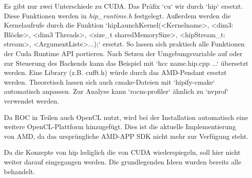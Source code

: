	Es gibt nur zwei Unterschiede zu CUDA. Das Präfix \li`cu` wir durch \li`hip` ersetzt. Diese Funktionen werden in \textit{hip{\_}runtime.h} festgelegt. Außerdem werden die \Gls{Kernel}aufrufe durch die Funktion \li`hipLaunchKernel(<Kernelname>, <dim3: Blöcke>, <dim3 Threads>, <size_t sharedMemorySize>, <hipStream_t: stream>, <ArgumentListe>...);` ersetzt. So lassen sich praktisch alle Funktionen der Cuda Runtime \Gls{API} portieren. Nach Setzen der Umgebungsvariable auf oder zur Steuerung des Backends kann das Beispiel mit \li`hcc name.hip.cpp ...` übersetzt werden. Eine Library (z.B. cufft.h) würde durch das AMD-Pendant ersetzt werden. Theoretisch lassen sich auch cmake-Dateien mit \li`hipify-cmake` automatisch anpassen. Zur Analyse kann \li`rocm-profiler` ähnlich zu \li`nvprof` verwendet werden.
	
	Da ROC in Teilen auch OpenCL nutzt, wird bei der Installation automatisch eine weitere OpenCL-Plattform hinzugefügt. Dies ist die aktuelle Implementierung von AMD, da das ursprüngliche AMD-APP SDK nicht mehr zur Verfügung steht.
	
	Da die Konzepte von hip lediglich die von CUDA wiederspiegeln, soll hier nicht weiter darauf eingegangen werden. Die grundlegenden Ideen wurden bereits alle behandelt.
